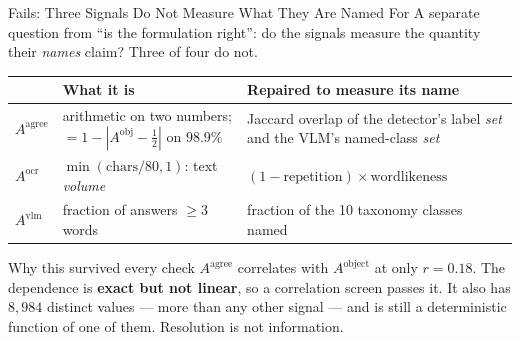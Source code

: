 \documentclass[aspectratio=169,11pt]{beamer}
\begin{document}
\begin{frame}{Fails: Three Signals Do Not Measure What They Are Named For}
\small
A separate question from ``is the formulation right'': do the signals measure the quantity their \emph{names} claim? Three of four do not.
\vspace{1mm}
\begin{center}
\scriptsize
\begin{tabular}{@{}l p{3.5cm} p{4.3cm}@{}}
\toprule
& \textbf{What it is} & \textbf{Repaired to measure its name} \\
\midrule
$A^{\text{agree}}$ & arithmetic on two numbers; $=1-|A^{\text{obj}}-\tfrac12|$ on $\mathbf{98.9\%}$ & Jaccard overlap of the detector's label \emph{set} and the VLM's named-class \emph{set} \\
\addlinespace
$A^{\text{ocr}}$ & $\min(\text{chars}/80,1)$: text \emph{volume} & $(1-\text{repetition})\times\text{wordlikeness}$ \\
\addlinespace
$A^{\text{vlm}}$ & fraction of answers $\ge 3$ words & fraction of the 10 taxonomy classes named \\
\bottomrule
\end{tabular}
\end{center}
\vspace{1mm}
\begin{alertblock}{\small Why this survived every check}
\footnotesize $A^{\text{agree}}$ correlates with $A^{\text{object}}$ at only $r=0.18$. The dependence is \textbf{exact but not linear}, so a correlation screen passes it. It also has $8{,}984$ distinct values --- more than any other signal --- and is still a deterministic function of one of them. Resolution is not information.
\end{alertblock}
\end{frame}
\end{document}
